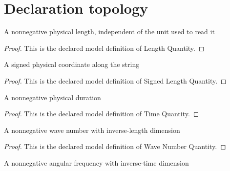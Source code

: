 \section{Declaration topology}
\begin{definition}
  \label{def:physics:phyx-mini-0294:phyxminiproblems-problemphyxmini0294-lengthquantity}
  A nonnegative physical length, independent of the unit used to read it
\end{definition}
\begin{proof}
  This is the declared model definition of Length Quantity.
\end{proof}
\begin{definition}
  \label{def:physics:phyx-mini-0294:phyxminiproblems-problemphyxmini0294-signedlengthquantity}
  A signed physical coordinate along the string
\end{definition}
\begin{proof}
  This is the declared model definition of Signed Length Quantity.
\end{proof}
\begin{definition}
  \label{def:physics:phyx-mini-0294:phyxminiproblems-problemphyxmini0294-timequantity}
  A nonnegative physical duration
\end{definition}
\begin{proof}
  This is the declared model definition of Time Quantity.
\end{proof}
\begin{definition}
  \label{def:physics:phyx-mini-0294:phyxminiproblems-problemphyxmini0294-wavenumberquantity}
  A nonnegative wave number with inverse-length dimension
\end{definition}
\begin{proof}
  This is the declared model definition of Wave Number Quantity.
\end{proof}
\begin{definition}
  \label{def:physics:phyx-mini-0294:phyxminiproblems-problemphyxmini0294-angularfrequencyquantity}
  A nonnegative angular frequency with inverse-time dimension
\end{definition}
